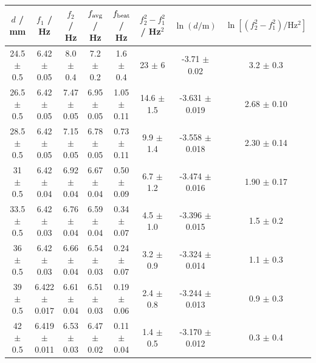 \begin{tabular}{@{}cccccccc@{}}
\toprule
$d$ / mm & $f_1$ / Hz & $f_2$ / Hz & $f_{\rm avg}$ / Hz & $f_{\rm beat}$ / Hz & $f_2^2-f_1^2$ / Hz$^2$ & $\ln(d/\mathrm{m})$ & $\ln[(f_2^2-f_1^2)/\mathrm{Hz^2}]$ \\
\midrule
24.5 $\pm$ 0.5 & 6.42 $\pm$ 0.05 & 8.0 $\pm$ 0.4 & 7.2 $\pm$ 0.2 & 1.6 $\pm$ 0.4 & 23 $\pm$ 6 & -3.71 $\pm$ 0.02 & 3.2 $\pm$ 0.3 \\
26.5 $\pm$ 0.5 & 6.42 $\pm$ 0.05 & 7.47 $\pm$ 0.05 & 6.95 $\pm$ 0.05 & 1.05 $\pm$ 0.11 & 14.6 $\pm$ 1.5 & -3.631 $\pm$ 0.019 & 2.68 $\pm$ 0.10 \\
28.5 $\pm$ 0.5 & 6.42 $\pm$ 0.05 & 7.15 $\pm$ 0.05 & 6.78 $\pm$ 0.05 & 0.73 $\pm$ 0.11 & 9.9 $\pm$ 1.4 & -3.558 $\pm$ 0.018 & 2.30 $\pm$ 0.14 \\
31 $\pm$ 0.5 & 6.42 $\pm$ 0.04 & 6.92 $\pm$ 0.04 & 6.67 $\pm$ 0.04 & 0.50 $\pm$ 0.09 & 6.7 $\pm$ 1.2 & -3.474 $\pm$ 0.016 & 1.90 $\pm$ 0.17 \\
33.5 $\pm$ 0.5 & 6.42 $\pm$ 0.03 & 6.76 $\pm$ 0.04 & 6.59 $\pm$ 0.04 & 0.34 $\pm$ 0.07 & 4.5 $\pm$ 1.0 & -3.396 $\pm$ 0.015 & 1.5 $\pm$ 0.2 \\
36 $\pm$ 0.5 & 6.42 $\pm$ 0.03 & 6.66 $\pm$ 0.04 & 6.54 $\pm$ 0.03 & 0.24 $\pm$ 0.07 & 3.2 $\pm$ 0.9 & -3.324 $\pm$ 0.014 & 1.1 $\pm$ 0.3 \\
39 $\pm$ 0.5 & 6.422 $\pm$ 0.017 & 6.61 $\pm$ 0.04 & 6.51 $\pm$ 0.03 & 0.19 $\pm$ 0.06 & 2.4 $\pm$ 0.8 & -3.244 $\pm$ 0.013 & 0.9 $\pm$ 0.3 \\
42 $\pm$ 0.5 & 6.419 $\pm$ 0.011 & 6.53 $\pm$ 0.03 & 6.47 $\pm$ 0.02 & 0.11 $\pm$ 0.04 & 1.4 $\pm$ 0.5 & -3.170 $\pm$ 0.012 & 0.3 $\pm$ 0.4 \\
\bottomrule
\end{tabular}